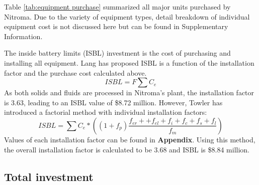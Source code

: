 Table \ref{tab:equipment purchase} summarized all major units purchased by Nitroma. Due to the variety of equipment types, detail breakdown of individual equipment cost is not discussed here but can be found in Supplementary Information.

The inside battery limits (ISBL) investment is the cost of purchasing and installing all equipment. Lang has proposed ISBL is a function of the installation factor and the purchase cost calculated above.
\begin{equation}
    ISBL=F\sum C_{e}    
\end{equation}
As both solids and fluids are processed in Nitroma's plant, the installation factor is 3.63, leading to an ISBL value of \$8.72 million. However, Towler \cite{sinnott_chemical_2020} has introduced a factorial method with individual installation factors:
\begin{equation}
    ISBL=\sum C_{e}*\left(\left(1+f_{p}\right)\frac{f_{er}++f_{el}+f_{i}+f_{c}+f_{s}+f_{l}}{f_{m}}\right)
\end{equation}
Values of each installation factor can be found in \textbf{Appendix}. Using this method, the overall installation factor is calculated to be 3.68 and ISBL is \$8.84 million.

\subsection{Total investment}


